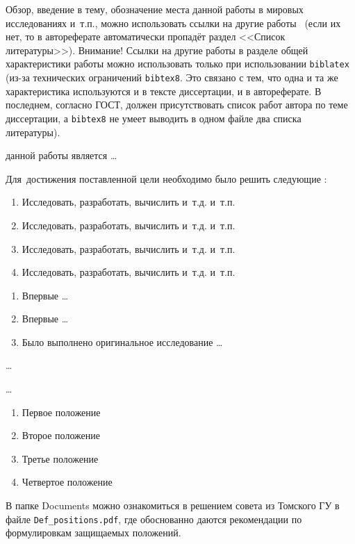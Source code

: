 
{\actuality} Обзор, введение в тему, обозначение места данной работы в
мировых исследованиях и~т.\:п., можно использовать ссылки на другие
работы~\cite{Gosele1999161} (если их нет, то в автореферате
автоматически пропадёт раздел <<Список литературы>>). Внимание! Ссылки
на другие работы в разделе общей характеристики работы можно
использовать только при использовании \verb!biblatex! (из-за технических
ограничений \verb!bibtex8!. Это связано с тем, что одна и та же
характеристика используются и в тексте диссертации, и в
автореферате. В последнем, согласно ГОСТ, должен присутствовать список
работ автора по теме диссертации, а \verb!bibtex8! не умеет выводить в одном
файле два списка литературы).




{\aim} данной работы является \ldots

Для~достижения поставленной цели необходимо было решить следующие {\tasks}:
\begin{enumerate}
  \item Исследовать, разработать, вычислить и~т.\:д. и~т.\:п.
  \item Исследовать, разработать, вычислить и~т.\:д. и~т.\:п.
  \item Исследовать, разработать, вычислить и~т.\:д. и~т.\:п.
  \item Исследовать, разработать, вычислить и~т.\:д. и~т.\:п.
\end{enumerate}


{\novelty}
\begin{enumerate}
  \item Впервые \ldots
  \item Впервые \ldots
  \item Было выполнено оригинальное исследование \ldots
\end{enumerate}

{\influence} \ldots

{\methods} \ldots

{}
\begin{enumerate}
  \item Первое положение
  \item Второе положение
  \item Третье положение
  \item Четвертое положение
\end{enumerate}
В папке Documents можно ознакомиться в решением совета из Томского ГУ
в файле \verb+Def_positions.pdf+, где обоснованно даются рекомендации
по формулировкам защищаемых положений. 

